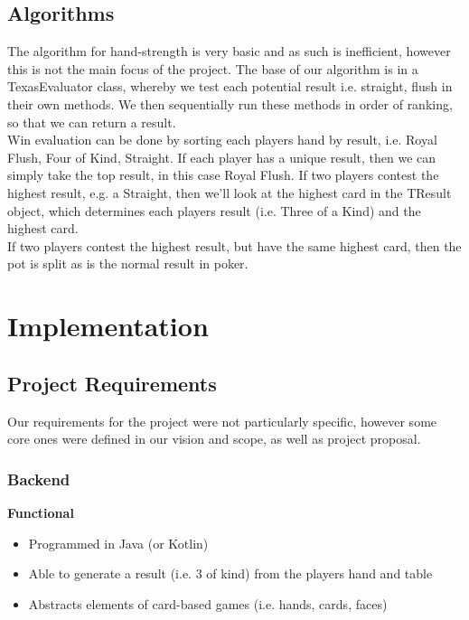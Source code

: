 \documentclass[11pt]{article}
\begin{document}
\newpage


\subsection{Algorithms}

The algorithm for hand-strength is very basic and as such is inefficient, however this is not the main focus of the project. The base of our algorithm is in a TexasEvaluator class, whereby we test each potential result i.e. straight, flush in their own methods. We then sequentially run these methods in order of ranking, so that we can return a result. \\


Win evaluation can be done by sorting each players hand by result, i.e. Royal Flush, Four of Kind, Straight. If each player has a unique result, then we can simply take the top result, in this case Royal Flush. If two players contest the highest result, e.g. a Straight, then we'll look at the highest card in the TResult object, which determines each players result (i.e. Three of a Kind) and the highest card. \\

If two players contest the highest result, but have the same highest card, then the pot is split as is the normal result in poker. 

\newpage
\section{Implementation}

\subsection{Project Requirements}
Our requirements for the project were not particularly specific, however some core ones were defined in our vision and scope, as well as project proposal. 

\subsubsection{Backend}
\textbf{Functional}
\begin{itemize}
	\item Programmed in Java (or Kotlin)
	\item Able to generate a result (i.e. 3 of kind) from the players hand and table
	\item Abstracts elements of card-based games (i.e. hands, cards, faces)
\end{itemize}
%	
\end{document}
